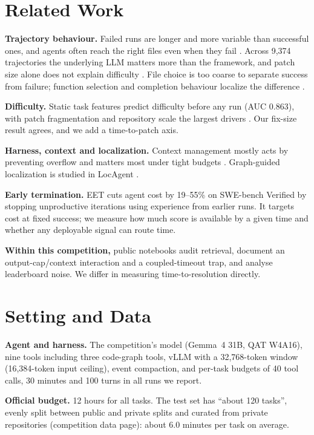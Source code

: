\documentclass[10pt,twocolumn]{article}
\begin{document}
\section{Related Work}
\textbf{Trajectory behaviour.} Failed runs are longer and more variable than successful ones, and agents often reach the right files even when they fail \cite{majgaonkar}. Across 9,374 trajectories the underlying LLM matters more than the framework, and patch size alone does not explain difficulty \cite{mehtiyev}. File choice is too coarse to separate success from failure; function selection and completion behaviour localize the difference \cite{shu}.

\textbf{Difficulty.} Static task features predict difficulty before any run (AUC 0.863), with patch fragmentation and repository scale the largest drivers \cite{alhaque}. Our fix-size result agrees, and we add a time-to-patch axis.

\textbf{Harness, context and localization.} Context management mostly acts by preventing overflow and matters most under tight budgets \cite{fan}. Graph-guided localization is studied in LocAgent \cite{locagent}.

\textbf{Early termination.} EET \cite{eet} cuts agent cost by 19--55\% on SWE-bench Verified by stopping unproductive iterations using experience from earlier runs. It targets cost at fixed success; we measure how much score is available by a given time and whether any deployable signal can route time.

\textbf{Within this competition,} public notebooks audit retrieval, document an output-cap/context interaction and a coupled-timeout trap, and analyse leaderboard noise. We differ in measuring time-to-resolution directly.

\section{Setting and Data}
\textbf{Agent and harness.} The competition's model (Gemma~4 31B, QAT W4A16), nine tools including three code-graph tools, vLLM with a 32,768-token window (16,384-token input ceiling), event compaction, and per-task budgets of 40 tool calls, 30 minutes and 100 turns in all runs we report.

\textbf{Official budget.} 12 hours for all tasks. The test set has ``about 120 tasks'', evenly split between public and private splits and curated from private repositories (competition data page): about 6.0 minutes per task on average.
\end{document}
